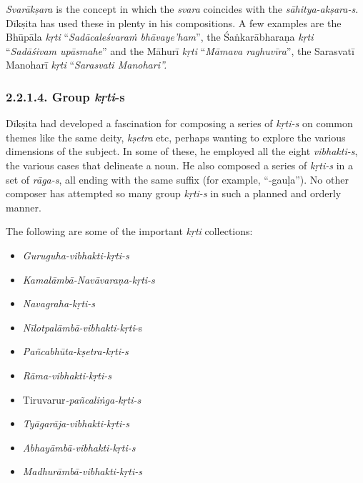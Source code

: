 \textit{Svarākṣara} is the concept in which the \textit{svara} coincides with the \textit{sāhitya-akṣara-s}. Dīkṣita has used these in plenty in his compositions. A few examples are the Bhūpāla \textit{kṛti} “\textit{Sadācaleśvaraṁ bhāvaye’ham}”, the Śaṅkarābharaṇa \textit{kṛti} “\textit{Sadāśivam upāsmahe}” and the Māhurī \textit{kṛti} “\textit{Māmava raghuvīra}”, the Sarasvatī Manoharī \textit{kṛti} “\textit{Sarasvati Manohari”.}


\subsubsection*{2.2.1.4. Group \textit{kṛti}-s}

Dīkṣita had developed a fascination for composing a series of \textit{kṛti-s} on common themes like the same deity, \textit{kṣetra} etc, perhaps wanting to explore the various dimensions of the subject. In some of these, he employed all the eight \textit{vibhakti-s}, the various cases that delineate a noun. He also composed a series of \textit{kṛti-s} in a set of \textit{rāga-s}, all ending with the same suffix (for example, “-gauḷa”). No other composer has attempted so many group \textit{kṛti-s} in such a planned and orderly manner.

The following are some of the important \textit{kṛti} collections:

\begin{itemize}
\itemsep=0pt

 \item \textit{Guruguha-vibhakti-kṛti-s}

 \item \textit{Kamalāmbā-Navāvaraṇa-kṛti-s}

 \item \textit{Navagraha-kṛti-s}

 \item \textit{Nīlotpalāmbā-vibhakti-kṛti}-s

 \item \textit{Pañcabhūta-kṣetra-kṛti-s}

 \item \textit{Rāma-vibhakti-kṛti-s}

 \item Tiruvarur\textit{-pañcaliṅga-kṛti-s}

 \item \textit{Tyāgarāja-vibhakti-kṛti-s}

 \item \textit{Abhayāmbā-vibhakti-kṛti-s}

 \item \textit{Madhurāmbā-vibhakti-kṛti-s}

\end{itemize}



